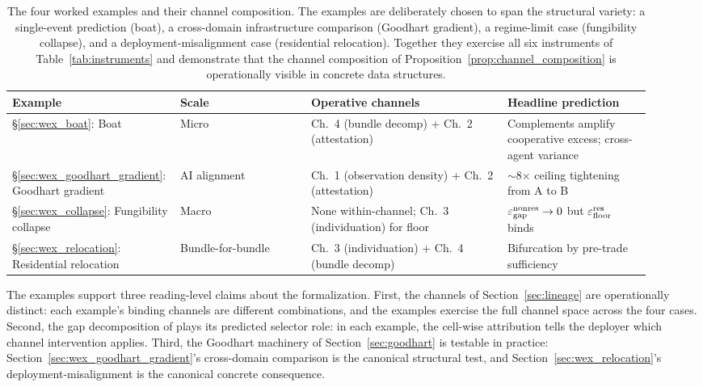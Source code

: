 \begin{table}[ht]
\centering
\footnotesize
\setlength{\tabcolsep}{4pt}
\begin{tabular}{>{\raggedright\arraybackslash}p{0.20\linewidth}
                >{\raggedright\arraybackslash}p{0.20\linewidth}
                >{\raggedright\arraybackslash}p{0.30\linewidth}
                >{\raggedright\arraybackslash}p{0.22\linewidth}}
\toprule
\textbf{Example} & \textbf{Scale} & \textbf{Operative channels} &
\textbf{Headline prediction} \\
\midrule
\S\ref{sec:wex_boat}: Boat &
Micro &
Ch.~4 (bundle decomp) + Ch.~2 (attestation) &
Complements amplify cooperative excess; cross-agent variance \\
\addlinespace
\S\ref{sec:wex_goodhart_gradient}: Goodhart gradient &
AI alignment &
Ch.~1 (observation density) + Ch.~2 (attestation) &
$\sim$8$\times$ ceiling tightening from A to B \\
\addlinespace
\S\ref{sec:wex_collapse}: Fungibility collapse &
Macro &
None within-channel; Ch.~3 (individuation) for floor &
$\varepsilon_{\mathrm{gap}}^{\mathrm{nonres}} \to 0$ but $\varepsilon_{\mathrm{floor}}^{\mathrm{res}}$ binds \\
\addlinespace
\S\ref{sec:wex_relocation}: Residential relocation &
Bundle-for-bundle &
Ch.~3 (individuation) + Ch.~4 (bundle decomp) &
Bifurcation by pre-trade sufficiency \\
\bottomrule
\end{tabular}
\caption{The four worked examples and their channel composition.
The examples are deliberately chosen to span the structural
variety: a single-event prediction (boat), a cross-domain
infrastructure comparison (Goodhart gradient), a regime-limit
case (fungibility collapse), and a deployment-misalignment case
(residential relocation).  Together they exercise all six
instruments of Table~\ref{tab:instruments} and demonstrate that
the channel composition of
Proposition~\ref{prop:channel_composition} is operationally
visible in concrete data structures.}
\label{tab:wex_summary}
\end{table}

The examples support three reading-level claims about the
formalization.  First, the channels of
Section~\ref{sec:lineage} are operationally distinct: each
example's binding channels are different combinations, and the
examples exercise the full channel space across the four cases.
Second, the gap decomposition of
\citep[Need~Sufficiency]{lasser2026paper8b} plays its predicted
selector role: in each example, the cell-wise attribution tells
the deployer which channel intervention applies.  Third, the
Goodhart machinery of Section~\ref{sec:goodhart} is testable in
practice: Section~\ref{sec:wex_goodhart_gradient}'s cross-domain
comparison is the canonical structural test, and
Section~\ref{sec:wex_relocation}'s deployment-misalignment is
the canonical concrete consequence.

